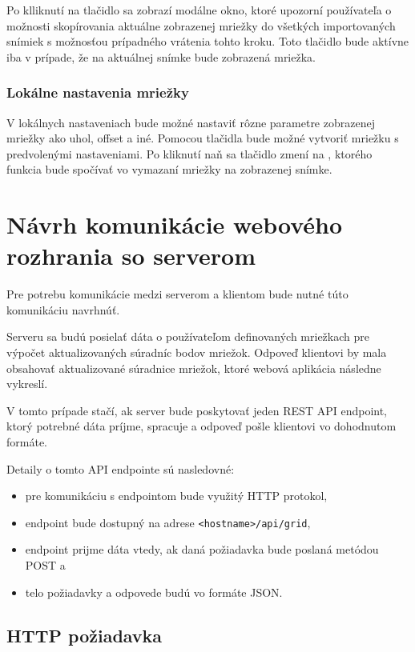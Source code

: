 Po klliknutí na tlačidlo  sa zobrazí modálne okno, ktoré upozorní používateľa o možnosti skopírovania aktuálne zobrazenej mriežky do všetkých importovaných snímiek s možnosťou prípadného vrátenia tohto kroku. Toto tlačidlo bude aktívne iba v prípade, že na aktuálnej snímke bude zobrazená mriežka.

\subsubsection* {Lokálne nastavenia mriežky}
V lokálnych nastaveniach bude možné nastaviť rôzne parametre zobrazenej mriežky ako uhol, offset a iné. Pomocou tlačidla  bude možné vytvoriť mriežku s predvolenými nastaveniami. Po kliknutí naň sa tlačidlo zmení na , ktorého funkcia bude spočívať vo vymazaní mriežky na zobrazenej snímke.

\section {Návrh komunikácie webového rozhrania so serverom}\label{api_endpoint}
Pre potrebu komunikácie medzi serverom a klientom bude nutné túto komunikáciu navrhnúť. 

Serveru sa budú posielať dáta o používateľom definovaných mriežkach pre výpočet aktualizovaných súradníc bodov mriežok. Odpoveď klientovi by mala obsahovať aktualizované súradnice mriežok, ktoré webová aplikácia následne vykreslí.

V tomto prípade stačí, ak server bude poskytovať jeden REST API endpoint, ktorý potrebné dáta príjme, spracuje a odpoveď pošle klientovi vo dohodnutom formáte.

Detaily o tomto API endpointe sú nasledovné:
\begin {itemize}
\item {pre komunikáciu s endpointom bude využitý HTTP protokol,}
\item {endpoint bude dostupný na adrese \texttt{<hostname>/api/grid},}
\item {endpoint prijme dáta vtedy, ak daná požiadavka bude poslaná metódou POST a}
\item {telo požiadavky a odpovede budú vo formáte JSON.}
\end {itemize}

\clearpage

\subsection {HTTP požiadavka}\label{http_request}

